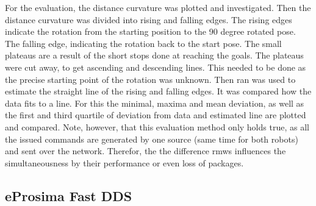 For the evaluation, the distance curvature was plotted and investigated. Then the distance curvature was divided into rising and falling edges. The rising edges indicate the rotation from the starting position to the 90 degree rotated pose. The falling edge, indicating the rotation back to the start pose. The small plateaus are a result of the short stops done at reaching the goals. The plateaus were cut away, to get ascending and descending lines. This needed to be done as the precise starting point of the rotation was unknown. Then \gls{ran} was used to estimate the straight line of the rising and falling edges. It was compared how the data fits to a line. For this the minimal, maxima and mean deviation, as well as the first and third quartile of deviation from data and estimated line are plotted and compared. Note, however, that this evaluation method only holds true, as all the issued commands are generated by one source (same time for both robots) and sent over the network. Therefor, the  the difference \glspl{rmw} influences the simultaneousness by their performance or even loss of packages.
\subsection{eProsima Fast DDS}
